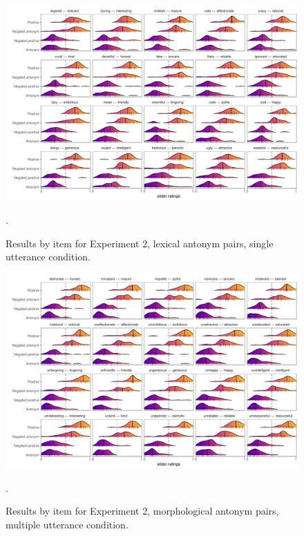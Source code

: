 \documentclass[floatsintext,doc]{apa6}
\begin{document}
\begin{figure}[t]
\centering \includegraphics{figs/cogsci_expt2_lex_singleUtt_byItem_densities.pdf} 
\caption{Results by item for Experiment 2, lexical antonym pairs, single utterance condition.}.\label{fig:items_lex_singleUtt_expt2}
\end{figure}

\begin{figure}[t]
\centering \includegraphics{figs/cogsci_expt2_morph_multiUtt_byItem_densities.pdf} 
\caption{Results by item for Experiment 2, morphological antonym pairs, multiple utterance condition.}.\label{fig:items_morph_multiUtt_expt2}
\end{figure}
\end{document}
